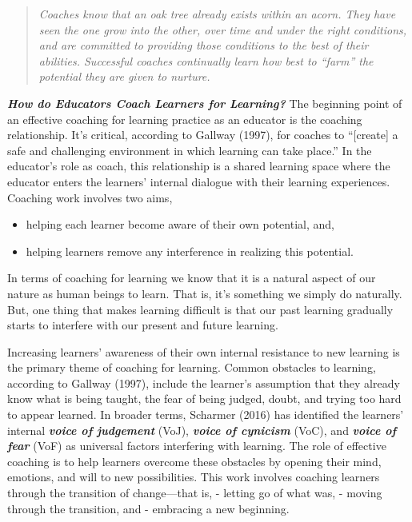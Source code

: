 \documentclass[
]{book}
\providecommand{\tightlist}{%
  \setlength{\itemsep}{0pt}\setlength{\parskip}{0pt}}
\begin{document}
\begin{quote}
\emph{Coaches know that an oak tree already exists within an acorn. They have seen the one grow into the other, over time and under the right conditions, and are committed to providing those conditions to the best of their abilities. Successful coaches continually learn how best to ``farm'' the potential they are given to nurture.}
\end{quote}

\textbf{\emph{How do Educators Coach Learners for Learning?}} The beginning point of an effective coaching for learning practice as an educator is the coaching relationship. It's critical, according to Gallway (1997), for coaches to ``{[}create{]} a safe and challenging environment in which learning can take place.'' In the educator's role as coach, this relationship is a shared learning space where the educator enters the learners' internal dialogue with their learning experiences. Coaching work involves two aims,

\begin{itemize}
\tightlist
\item
  helping each learner become aware of their own potential, and,\\
\item
  helping learners remove any interference in realizing this potential.
\end{itemize}

In terms of coaching for learning we know that it is a natural aspect of our nature as human beings to learn. That is, it's something we simply do naturally. But, one thing that makes learning difficult is that our past learning gradually starts to interfere with our present and future learning.

Increasing learners' awareness of their own internal resistance to new learning is the primary theme of coaching for learning. Common obstacles to learning, according to Gallway (1997), include the learner's assumption that they already know what is being taught, the fear of being judged, doubt, and trying too hard to appear learned. In broader terms, Scharmer (2016) has identified the learners' internal \textbf{\emph{voice of judgement}} (VoJ), \textbf{\emph{voice of cynicism}} (VoC), and \textbf{\emph{voice of fear}} (VoF) as universal factors interfering with learning. The role of effective coaching is to help learners overcome these obstacles by opening their mind, emotions, and will to new possibilities. This work involves coaching learners through the transition of change---that is,
- letting go of what was,
- moving through the transition, and
- embracing a new beginning.
\end{document}
